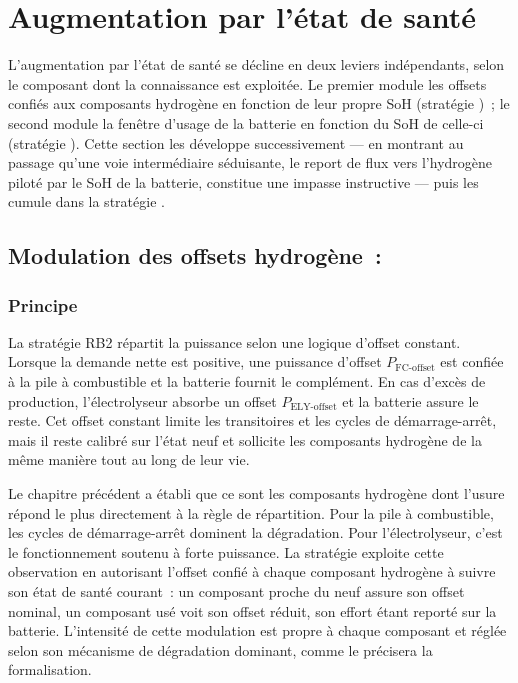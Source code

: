 
\section{Augmentation par l'état de santé}
\label{sec:soh_aware}

L'augmentation par l'état de santé se décline en deux leviers indépendants, selon le composant dont la connaissance est exploitée. Le premier module les offsets confiés aux composants hydrogène en fonction de leur propre SoH (stratégie \RBsohH)~; le second module la fenêtre d'usage de la batterie en fonction du SoH de celle-ci (stratégie \RBsohB). Cette section les développe successivement — en montrant au passage qu'une voie intermédiaire séduisante, le report de flux vers l'hydrogène piloté par le SoH de la batterie, constitue une impasse instructive — puis les cumule dans la stratégie \RBsohA.

\subsection{Modulation des offsets hydrogène~: \RBsohH}
\label{subsec:rb2sohh2}

\subsubsection{Principe}

La stratégie RB2 répartit la puissance selon une logique d'offset constant. Lorsque la demande nette est positive, une puissance d'offset $P_{\text{FC-offset}}$ est confiée à la pile à combustible et la batterie fournit le complément. En cas d'excès de production, l'électrolyseur absorbe un offset $P_{\text{ELY-offset}}$ et la batterie assure le reste. Cet offset constant limite les transitoires et les cycles de démarrage-arrêt, mais il reste calibré sur l'état neuf et sollicite les composants hydrogène de la même manière tout au long de leur vie.

Le chapitre précédent a établi que ce sont les composants hydrogène dont l'usure répond le plus directement à la règle de répartition. Pour la pile à combustible, les cycles de démarrage-arrêt dominent la dégradation. Pour l'électrolyseur, c'est le fonctionnement soutenu à forte puissance. La stratégie \RBsohH{} exploite cette observation en autorisant l'offset confié à chaque composant hydrogène à suivre son état de santé courant~: un composant proche du neuf assure son offset nominal, un composant usé voit son offset réduit, son effort étant reporté sur la batterie. L'intensité de cette modulation est propre à chaque composant et réglée selon son mécanisme de dégradation dominant, comme le précisera la formalisation.

